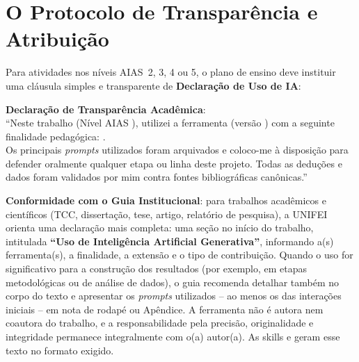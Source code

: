 \section{O Protocolo de Transpar{\^e}ncia e Atribui{\c c}{\~a}o}

Para atividades nos n{\'i}veis AIAS~2, 3, 4 ou 5, o plano de ensino deve instituir uma cl{\'a}usula simples e transparente de \textbf{Declara{\c c}{\~a}o de Uso de IA}:

\begin{tcolorbox}[colback=white, colframe=boxborder, arc=1mm, title={Modelo de Declara{\c c}{\~a}o de Uso de IA a ser Anexada pelo Estudante}]
\small
\textbf{Declara{\c c}{\~a}o de Transpar{\^e}ncia Acad{\^e}mica}:\\
``Neste trabalho (N{\'i}vel AIAS \underline{\hspace{1cm}}), utilizei a ferramenta \underline{\hspace{3cm}} (vers{\~a}o \underline{\hspace{1.5cm}}) com a seguinte finalidade pedag{\'o}gica: \underline{\hspace{6cm}}.\\
Os principais \emph{prompts} utilizados foram arquivados e coloco-me {\`a} disposi{\c c}{\~a}o para defender oralmente qualquer etapa ou linha deste projeto. Todas as dedu{\c c}{\~o}es e dados foram validados por mim contra fontes bibliogr{\'a}ficas can{\^o}nicas.''
\end{tcolorbox}

\begin{atencaopedagogica}
\textbf{Conformidade com o Guia Institucional}: para trabalhos acad{\^e}micos e cient{\'i}ficos (TCC, disserta{\c c}{\~a}o, tese, artigo, relat{\'o}rio de pesquisa), a UNIFEI \cite{unifei2026guia} orienta uma declara{\c c}{\~a}o mais completa: uma se{\c c}{\~a}o no in{\'i}cio do trabalho, intitulada \textbf{``Uso de Intelig{\^e}ncia Artificial Generativa''}, informando a(s) ferramenta(s), a finalidade, a extens{\~a}o e o tipo de contribui{\c c}{\~a}o. Quando o uso for significativo para a constru{\c c}{\~a}o dos resultados (por exemplo, em etapas metodol{\'o}gicas ou de an{\'a}lise de dados), o guia recomenda detalhar tamb{\'e}m no corpo do texto e apresentar os \emph{prompts} utilizados -- ao menos os das intera{\c c}{\~o}es iniciais -- em nota de rodap{\'e} ou Ap{\^e}ndice. A ferramenta n{\~a}o {\'e} autora nem coautora do trabalho, e a responsabilidade pela precis{\~a}o, originalidade e integridade permanece integralmente com o(a) autor(a). As skills  e  geram esse texto no formato exigido.
\end{atencaopedagogica}

